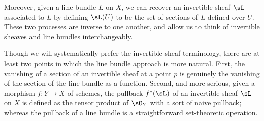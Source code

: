 Moreover,
given a line bundle $L$ on $X$, we can recover an invertible sheaf $\sL$ associated to $L$ by defining
$\sL(U)$ to be the set of sections of $L$ defined over $U$. These two processes are inverse to one another, and allow
us to think of invertible sheaves and line bundles interchangeably.

Though we will systematically prefer the invertible sheaf terminology, there are at least two points in which the line bundle approach is more natural. First,  the vanishing of a section of an invertible sheaf at a point $p$ is genuinely the vanishing of the 
section of the line bundle as a function. Second, and more serious, given a morphism $f: Y\to X$ of schemes, the 
pullback $f^*(\sL)$ of an invertible sheaf $\sL$ on $X$ is defined as the tensor product of $\sO_Y$ with a sort of naive pullback; whereas the pullback of a line bundle is a straightforward set-theoretic operation.


% 

